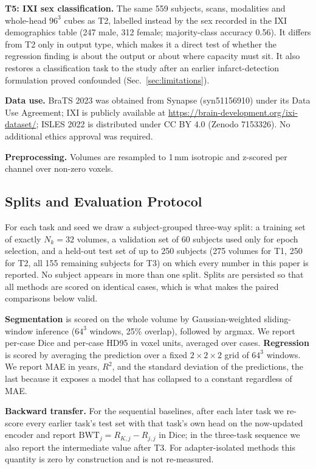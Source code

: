 \documentclass[journal,twoside,web]{ieeecolor}
\begin{document}
\textbf{T5: IXI sex classification.} The same 559 subjects, scans, modalities and whole-head $96^3$ cubes as T2, labelled instead by the sex recorded in the IXI demographics table (247 male, 312 female; majority-class accuracy 0.56). It differs from T2 only in output type, which makes it a direct test of whether the regression finding is about the output or about where capacity must sit. It also restores a classification task to the study after an earlier infarct-detection formulation proved confounded (Sec.~\ref{sec:limitations}).

\textbf{Data use.} BraTS 2023 was obtained from Synapse (syn51156910) under its Data Use Agreement; IXI is publicly available at \url{https://brain-development.org/ixi-dataset/}; ISLES 2022 is distributed under CC BY 4.0 (Zenodo 7153326). No additional ethics approval was required.

\textbf{Preprocessing.} Volumes are resampled to 1\,mm isotropic and z-scored per channel over non-zero voxels.

\subsection{Splits and Evaluation Protocol}
\label{sec:protocol}

For each task and seed we draw a subject-grouped three-way split: a training set of exactly $N_k=32$ volumes, a validation set of 60 subjects used only for epoch selection, and a held-out test set of up to 250 subjects (275 volumes for T1, 250 for T2, all 155 remaining subjects for T3) on which every number in this paper is reported. No subject appears in more than one split. Splits are persisted so that all methods are scored on identical cases, which is what makes the paired comparisons below valid.

\textbf{Segmentation} is scored on the whole volume by Gaussian-weighted sliding-window inference ($64^3$ windows, 25\% overlap), followed by argmax. We report per-case Dice and per-case HD95 in voxel units, averaged over cases. \textbf{Regression} is scored by averaging the prediction over a fixed $2{\times}2{\times}2$ grid of $64^3$ windows. We report MAE in years, $R^2$, and the standard deviation of the predictions, the last because it exposes a model that has collapsed to a constant regardless of MAE.

\textbf{Backward transfer.} For the sequential baselines, after each later task we re-score every earlier task's test set with that task's own head on the now-updated encoder and report $\text{BWT}_j = R_{K,j} - R_{j,j}$ in Dice; in the three-task sequence we also report the intermediate value after T3. For adapter-isolated methods this quantity is zero by construction and is not re-measured.
\end{document}
